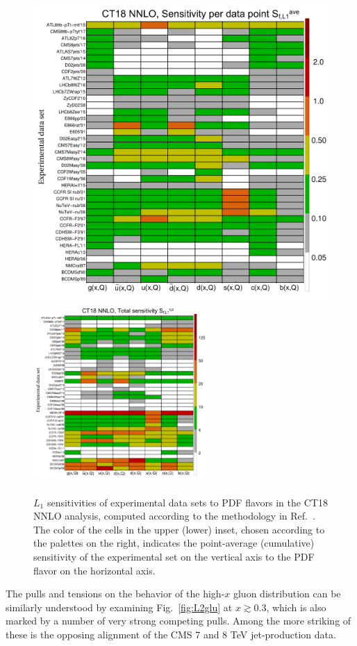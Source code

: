 \begin{figure}[p]
\center
  \includegraphics[width=0.59 \textwidth]{./fig/ave_S_bycolor_ct18nn.pdf}\\ 
  \includegraphics[width=0.59\textwidth]{./fig/total_S_bycolor_ct18nn.pdf}
        	\caption{$L_1$ sensitivities of experimental data
                  sets to PDF flavors in the CT18 NNLO analysis,
                  computed according to the methodology in
                  Ref.~\cite{Wang:2018heo}. The color of the cells
                  in the upper (lower) inset, 
                  chosen according to the palettes on the right,
                  indicates the point-average
                  (cumulative) sensitivity of the experimental set
                  on the vertical axis to the PDF flavor
                  on the horizontal axis. 
		\label{fig:CT18quilts}}
\end{figure}


The pulls and tensions on the behavior of the high-$x$ gluon
distribution can be similarly understood by examining
Fig.~\ref{fig:L2glu} at $x\! \gtrsim\! 0.3$, which is also marked by a
number of very strong competing pulls. Among the more striking of
these is the opposing alignment of the CMS 7 and 8 TeV jet-production data. 

